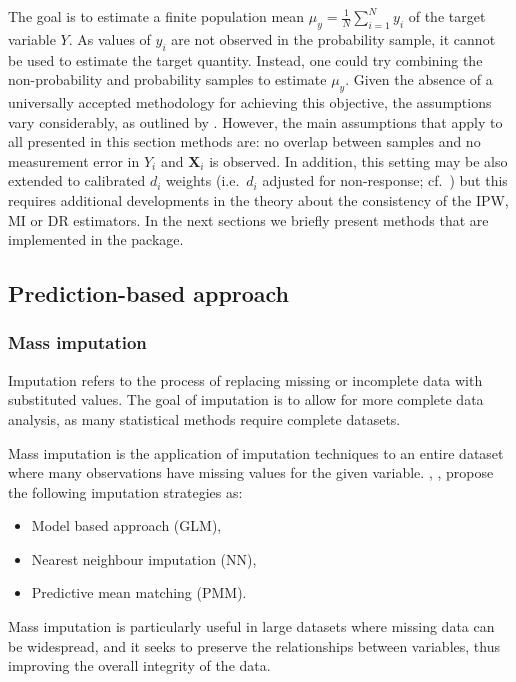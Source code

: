 \documentclass[
]{jss}
\begin{document}
The goal is to estimate a finite population mean
\(\displaystyle\mu_{y}=\frac{1}{N}\sum_{i=1}^{N} y_{i}\) of the target
variable \(Y\). As values of \(y_{i}\) are not observed in the
probability sample, it cannot be used to estimate the target quantity.
Instead, one could try combining the non-probability and probability
samples to estimate \(\mu_{y}\). Given the absence of a universally
accepted methodology for achieving this objective, the assumptions vary
considerably, as outlined by \citet{wu2022statistical}. However, the
main assumptions that apply to all presented in this section methods
are: no overlap between samples and no measurement error in \(Y_i\) and
\(\boldsymbol{X}_i\) is observed. In addition, this setting may be also
extended to calibrated \(d_i\) weights (i.e.~\(d_i\) adjusted for
non-response; cf.~\citet{sarndal2007calibration}) but this requires
additional developments in the theory about the consistency of the IPW,
MI or DR estimators. In the next sections we briefly present methods
that are implemented in the package.

\subsection{Prediction-based approach}\label{sec-prediction}

\subsubsection{Mass imputation}\label{mass-imputation}

Imputation refers to the process of replacing missing or incomplete data
with substituted values. The goal of imputation is to allow for more
complete data analysis, as many statistical methods require complete
datasets.

Mass imputation is the application of imputation techniques to an entire
dataset where many observations have missing values for the given
variable. \cite{kim_combining_2021}, \cite{yang2021integration},
\cite{Beres} propose the following imputation strategies as:

\begin{itemize}
    \item Model based approach (GLM),
    \item Nearest neighbour imputation (NN),
    \item Predictive mean matching (PMM).
\end{itemize}

Mass imputation is particularly useful in large datasets where missing
data can be widespread, and it seeks to preserve the relationships
between variables, thus improving the overall integrity of the data.
\end{document}

